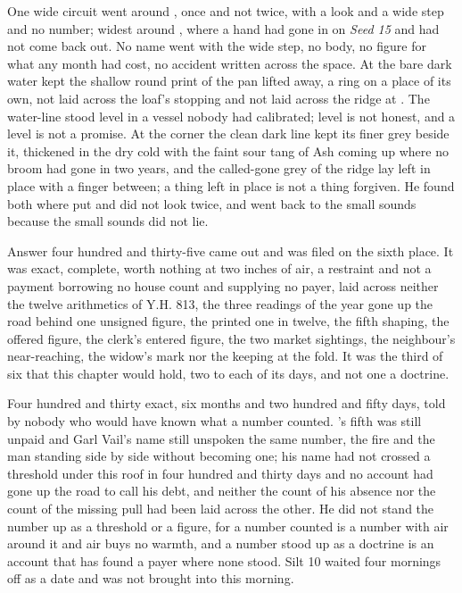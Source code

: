 One wide circuit went around , once and not twice, with a look and a wide step and no number; widest around , where a hand had gone in on \emph{Seed 15} and had not come back out. No name went with the wide step, no body, no figure for what any month had cost, no accident written across the space. At  the bare dark water kept the shallow round print of the pan lifted away, a ring on a place of its own, not laid across the loaf's stopping and not laid across the ridge at . The water-line stood level in a vessel nobody had calibrated; level is not honest, and a level is not a promise. At the corner the clean dark line kept its finer grey beside it, thickened in the dry cold with the faint sour tang of Ash coming up where no broom had gone in two years, and the called-gone grey of the ridge lay left in place with a finger between; a thing left in place is not a thing forgiven. He found both where put and did not look twice, and went back to the small sounds because the small sounds did not lie.

Answer four hundred and thirty-five came out and was filed on the sixth place. It was exact, complete, worth nothing at two inches of air, a restraint and not a payment borrowing no house count and supplying no payer, laid across neither the twelve arithmetics of Y.H. 813, the three readings of the year gone up the road behind one unsigned figure, the printed one in twelve, the fifth shaping, the offered figure, the clerk's entered figure, the two market sightings, the neighbour's near-reaching, the widow's mark nor the keeping at the fold. It was the third of six that this chapter would hold, two to each of its days, and not one a doctrine.

Four hundred and thirty exact, six months and two hundred and fifty days, told by nobody who would have known what a number counted. 's fifth was still unpaid and Garl Vail's name still unspoken the same number, the fire and the man standing side by side without becoming one; his name had not crossed a threshold under this roof in four hundred and thirty days and no account had gone up the road to call his debt, and neither the count of his absence nor the count of the missing pull had been laid across the other. He did not stand the number up as a threshold or a figure, for a number counted is a number with air around it and air buys no warmth, and a number stood up as a doctrine is an account that has found a payer where none stood. Silt 10 waited four mornings off as a date and was not brought into this morning.

